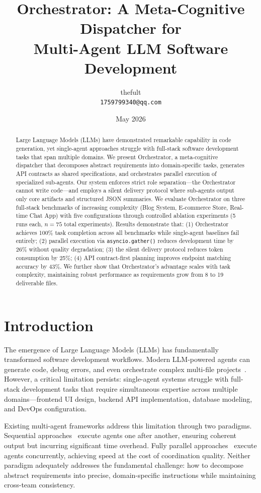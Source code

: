 \documentclass[12pt]{article}
\title{Orchestrator: A Meta-Cognitive Dispatcher for\\Multi-Agent LLM Software Development}
\author{
  thefult \\
  \texttt{1759799340@qq.com}
}
\date{May 2026}
\begin{document}
\maketitle

\begin{abstract}
Large Language Models (LLMs) have demonstrated remarkable capability in code generation, yet single-agent approaches struggle with full-stack software development tasks that span multiple domains. We present Orchestrator, a meta-cognitive dispatcher that decomposes abstract requirements into domain-specific tasks, generates API contracts as shared specifications, and orchestrates parallel execution of specialized sub-agents. Our system enforces strict role separation---the Orchestrator cannot write code---and employs a silent delivery protocol where sub-agents output only core artifacts and structured JSON summaries. We evaluate Orchestrator on three full-stack benchmarks of increasing complexity (Blog System, E-commerce Store, Real-time Chat App) with five configurations through controlled ablation experiments (5 runs each, $n=75$ total experiments). Results demonstrate that: (1) Orchestrator achieves 100\% task completion across all benchmarks while single-agent baselines fail entirely; (2) parallel execution via \texttt{asyncio.gather()} reduces development time by 26\% without quality degradation; (3) the silent delivery protocol reduces token consumption by 25\%; (4) API contract-first planning improves endpoint matching accuracy by 43\%. We further show that Orchestrator's advantage scales with task complexity, maintaining robust performance as requirements grow from 8 to 19 deliverable files.
\end{abstract}

\section{Introduction}

The emergence of Large Language Models (LLMs) has fundamentally transformed software development workflows. Modern LLM-powered agents can generate code, debug errors, and even orchestrate complex multi-file projects~\cite{li2023}. However, a critical limitation persists: single-agent systems struggle with full-stack development tasks that require simultaneous expertise across multiple domains---frontend UI design, backend API implementation, database modeling, and DevOps configuration.

Existing multi-agent frameworks address this limitation through two paradigms. Sequential approaches~\cite{autogen} execute agents one after another, ensuring coherent output but incurring significant time overhead. Fully parallel approaches~\cite{park2023} execute agents concurrently, achieving speed at the cost of coordination quality. Neither paradigm adequately addresses the fundamental challenge: how to decompose abstract requirements into precise, domain-specific instructions while maintaining cross-team consistency.
\end{document}

